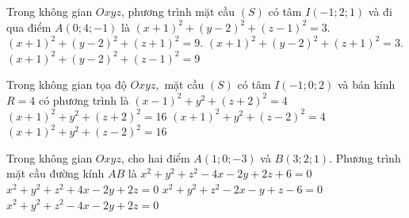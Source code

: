 \begin{ex}%
	Trong không gian $Oxyz$, phương trình  mặt cầu $(S)$ có tâm $I\left(-1;2;1\right)$ và đi qua điểm $A\left(0;4;-1\right)$ là
	 \choice
		 {$\left(x+1\right)^2+\left(y-2\right)^2+\left(z-1\right)^2=3.$}
		 {$\left(x+1\right)^2+\left(y-2\right)^2+\left(z+1\right)^2=9.$}
		 {$\left(x+1\right)^2+\left(y-2\right)^2+\left(z+1\right)^2=3.$}
		{\True $\left(x+1\right)^2+\left(y-2\right)^2+\left(z-1\right)^2=9$} 
\end{ex}

\begin{ex}%
	Trong không gian  tọa độ $Oxyz,$ mặt cầu $(S)$ có tâm $I\left(-1;0;2\right)$ và bán kính $R=4$ có phương trình là
	\choice 
		{$\left(x-1\right)^2+y^2+\left(z+2\right)^2=4$} 
		{$\left(x+1\right)^2+y^2+\left(z+2\right)^2=16$} 
		{$\left(x+1\right)^2+y^2+\left(z-2\right)^2=4$} 
		 {\True $\left(x+1\right)^2+y^2+\left(z-2\right)^2=16$}
\end{ex}

\begin{ex}%
	 Trong không gian $Oxyz$, cho hai điểm $A(1;0;-3)$ và $B(3;2;1)$. Phương trình mặt cầu đường kính $AB$ là
	\choice 
		{$x^2+y^2+z^2-4x-2y+2z+6=0$} 
		{$x^2+y^2+z^2+4x-2y+2z=0$} 
		{$x^2+y^2+z^2-2x-y+z-6=0$} 
		 {\True $x^2+y^2+z^2-4x-2y+2z=0$}
\end{ex}

